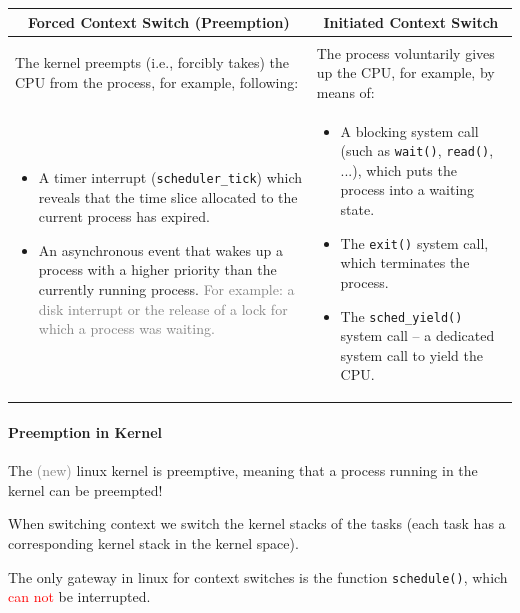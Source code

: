 \documentclass[openany,12pt]{book}
\newcommand{\code}[1]{\texttt{#1}}
\newcommand{\red}[1]{\textcolor{Red}{#1}}
\newcommand{\gray}[1]{\textcolor{gray}{#1}}
\begin{document}
\begin{tabularx}{\textwidth}{|X|X|}
\hline
\multicolumn{1}{|c|}{\textbf{Forced Context Switch (Preemption)}} & \multicolumn{1}{c|}{\textbf{Initiated Context Switch}} \\
\hline
 & \\
The kernel preempts (i.e., forcibly takes) the CPU from the process, for example, following: & The process voluntarily gives up the CPU, for example, by means of: \\
\begin{itemize}
    \item A timer interrupt (\texttt{scheduler\_tick}) which reveals that the time slice allocated to the current process has expired.
    \item An asynchronous event that wakes up a process with a higher priority than the currently running process. \gray{For example: a disk interrupt or the release of a lock for which a process was waiting.}
\end{itemize}
&
\begin{itemize}
    \item A blocking system call (such as \texttt{wait()}, \texttt{read()}, ...), which puts the process into a waiting state.
    \item The \texttt{exit()} system call, which terminates the process.
    \item The \texttt{sched\_yield()} system call -- a dedicated system call to yield the CPU.
\end{itemize}
\\
\hline
\end{tabularx}



\paragraph{Preemption in Kernel} The \gray{(new)} linux kernel is preemptive, meaning that a process running in the kernel can be preempted!


When switching context we switch the kernel stacks of the tasks (each task has a corresponding kernel stack in the kernel space).

The only gateway in linux for context switches is the function \code{schedule()}, which \red{can not} be interrupted.
\end{document}
